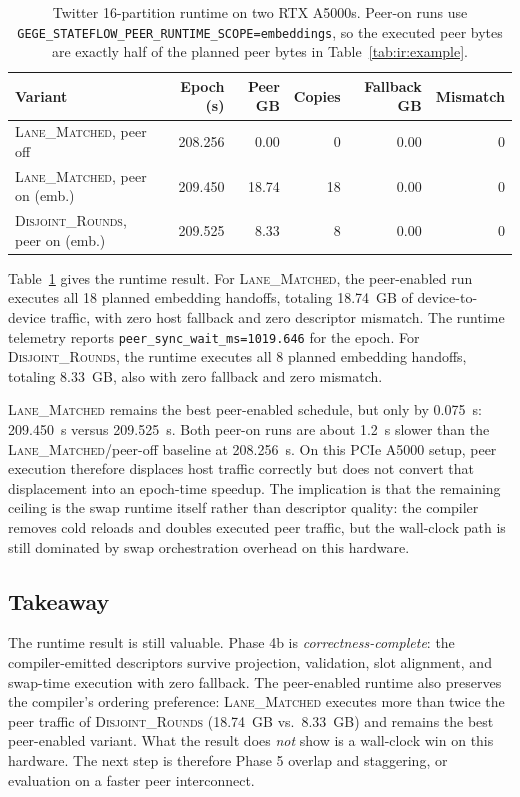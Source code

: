 \begin{table}[t]
\centering
\small
\begin{tabular}{lrrrrr}
\toprule
Variant & Epoch (s) & Peer GB & Copies & Fallback GB & Mismatch \\
\midrule
\textsc{Lane\_Matched}, peer off          & 208.256 & 0.00  & 0  & 0.00 & 0 \\
\textsc{Lane\_Matched}, peer on (emb.)    & 209.450 & 18.74 & 18 & 0.00 & 0 \\
\textsc{Disjoint\_Rounds}, peer on (emb.) & 209.525 & 8.33  & 8  & 0.00 & 0 \\
\bottomrule
\end{tabular}
\caption{Twitter 16-partition runtime on two RTX A5000s. Peer-on runs
use \texttt{GEGE\_STATEFLOW\_PEER\_RUNTIME\_SCOPE=embeddings}, so the
executed peer bytes are exactly half of the planned peer bytes in
Table~\ref{tab:ir:example}.}
\label{tab:eval:runtime}
\end{table}

Table~\ref{tab:eval:runtime} gives the runtime result. For
\textsc{Lane\_Matched}, the peer-enabled run executes all 18 planned
embedding handoffs, totaling \SI{18.74}{GB} of device-to-device
traffic, with zero host fallback and zero descriptor mismatch. The
runtime telemetry reports \texttt{peer\_sync\_wait\_ms=1019.646} for
the epoch. For \textsc{Disjoint\_Rounds}, the runtime executes all 8
planned embedding handoffs, totaling \SI{8.33}{GB}, also with zero
fallback and zero mismatch.

\textsc{Lane\_Matched} remains the best peer-enabled schedule, but only
by \SI{0.075}{s}: \SI{209.450}{s} versus \SI{209.525}{s}. Both peer-on
runs are about \SI{1.2}{s} slower than the
\textsc{Lane\_Matched}/peer-off baseline at \SI{208.256}{s}. On this
PCIe A5000 setup, peer execution therefore displaces host traffic
correctly but does not convert that displacement into an epoch-time
speedup. The implication is that the remaining ceiling is the swap
runtime itself rather than descriptor quality: the compiler removes
cold reloads and doubles executed peer traffic, but the wall-clock path
is still dominated by swap orchestration overhead on this hardware.

\subsection{Takeaway}

The runtime result is still valuable. Phase 4b is
\emph{correctness-complete}: the compiler-emitted descriptors survive
projection, validation, slot alignment, and swap-time execution with
zero fallback. The peer-enabled runtime also preserves the compiler's
ordering preference: \textsc{Lane\_Matched} executes more than twice the
peer traffic of \textsc{Disjoint\_Rounds}
(\SI{18.74}{GB} vs.\ \SI{8.33}{GB}) and remains the best peer-enabled
variant. What the result does \emph{not} show is a wall-clock win on
this hardware. The next step is therefore Phase 5 overlap and
staggering, or evaluation on a faster peer interconnect.
